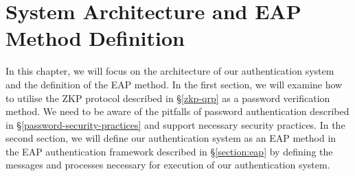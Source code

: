 \chapter{System Architecture and EAP Method Definition}
\thispagestyle{fancy}
\label{chapter:3}

\noindent 
In this chapter, we will focus on the architecture of our authentication system and the definition of the EAP method.
In the first section, we will examine how to utilise the ZKP protocol described in \S\ref{zkp-qrp} as a password verification method.
We need to be aware of the pitfalls of password authentication described in \S\ref{password-security-practices} and support necessary security practices.
In the second section, we will define our authentication system as an EAP method in the EAP authentication framework described in \S\ref{section:eap} by defining the messages and processes necessary for execution of our authentication system.